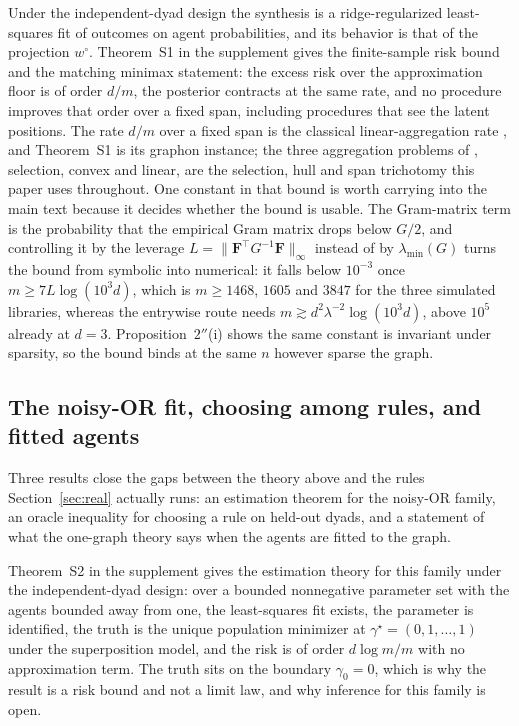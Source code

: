 \documentclass[12pt]{article}
\newcommand{\supn}[1]{\|#1\|_{\infty}}
\newcommand{\wproj}{w^{\circ}}
\newcommand{\Fv}{\mathbf{F}}
\begin{document}
Under the independent-dyad design the synthesis is a ridge-regularized least-squares fit of outcomes on agent probabilities, and its behavior is that of the projection $\wproj$. Theorem~S1 in the supplement gives the finite-sample risk bound and the matching minimax statement: the excess risk over the approximation floor is of order $d/m$, the posterior contracts at the same rate, and no procedure improves that order over a fixed span, including procedures that see the latent positions. The rate $d/m$ over a fixed span is the classical linear-aggregation rate \citep{Tsybakov2003, BuneaTsybakovWegkamp2007}, and Theorem~S1 is its graphon instance; the three aggregation problems of \citet{Tsybakov2003}, selection, convex and linear, are the selection, hull and span trichotomy this paper uses throughout. One constant in that bound is worth carrying into the main text because it decides whether the bound is usable. The Gram-matrix term is the probability that the empirical Gram matrix drops below $G/2$, and controlling it by the leverage $L=\supn{\Fv^{\top}G^{-1}\Fv}$ instead of by $\lambda_{\min}(G)$ turns the bound from symbolic into numerical: it falls below $10^{-3}$ once $m\ge7L\log(10^{3}d)$, which is $m\ge1468$, $1605$ and $3847$ for the three simulated libraries, whereas the entrywise route needs $m\gtrsim d^2\lambda^{-2}\log(10^{3}d)$, above $10^{5}$ already at $d=3$. Proposition~$2''$(i) shows the same constant is invariant under sparsity, so the bound binds at the same $n$ however sparse the graph.

\subsection{The noisy-OR fit, choosing among rules, and fitted agents}
\label{sec:fitted}

Three results close the gaps between the theory above and the rules Section~\ref{sec:real} actually runs: an estimation theorem for the noisy-OR family, an oracle inequality for choosing a rule on held-out dyads, and a statement of what the one-graph theory says when the agents are fitted to the graph.

Theorem~S2 in the supplement gives the estimation theory for this family under the independent-dyad design: over a bounded nonnegative parameter set with the agents bounded away from one, the least-squares fit exists, the parameter is identified, the truth is the unique population minimizer at $\gamma^\star=(0,1,\dots,1)$ under the superposition model, and the risk is of order $d\log m/m$ with no approximation term. The truth sits on the boundary $\gamma_0=0$, which is why the result is a risk bound and not a limit law, and why inference for this family is open.
\end{document}
